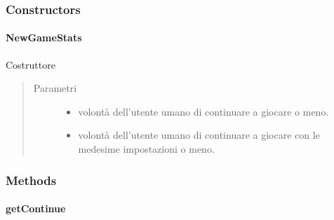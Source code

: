 \documentclass[letterpaper,10pt,italian,openany,oneside]{sphinxmanual}
\begin{document}
\subsubsection{Constructors}
\label{\detokenize{source/it/unicam/cs/pa/mastermind/gamecore/NewGameStats:constructors}}

\paragraph{NewGameStats}
\label{\detokenize{source/it/unicam/cs/pa/mastermind/gamecore/NewGameStats:id1}}

\begin{fulllineitems}
\label{\detokenize{source/it/unicam/cs/pa/mastermind/gamecore/NewGameStats:it.unicam.cs.pa.mastermind.gamecore.NewGameStats.NewGameStats(boolean, boolean)}}
Costruttore
\begin{quote}\begin{description}
\item[{Parametri}] \leavevmode\begin{itemize}
\item {} 
 \textendash{} volontà dell’utente umano di continuare a giocare o meno.

\item {} 
 \textendash{} volontà dell’utente umano di continuare a giocare con le medesime impostazioni o meno.

\end{itemize}

\end{description}\end{quote}

\end{fulllineitems}



\subsubsection{Methods}
\label{\detokenize{source/it/unicam/cs/pa/mastermind/gamecore/NewGameStats:methods}}

\paragraph{getContinue}
\label{\detokenize{source/it/unicam/cs/pa/mastermind/gamecore/NewGameStats:getcontinue}}
\end{document}
